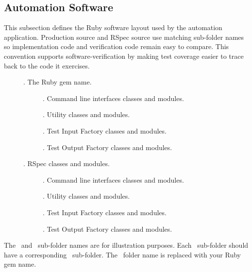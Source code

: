 \clearpage
\subsection{Automation Software}


\tlcVspace%

This subsection defines the Ruby software layout used by the automation
application. Production source and RSpec source use matching sub-folder names so
implementation code and verification code remain easy to compare. This
convention supports \gls{software-verification} by making test coverage easier
to trace back to the code it exercises.

\tlcVspace%

\begin{description}

  \item[\apName] \required. The Ruby gem name.
    \begin{description}
      \item[\apCli] \suggested. Command line interfaces classes and modules.
      \item[\apUtil] \suggested. Utility classes and modules.
      \item[\apTif] \suggested. Test Input Factory classes and modules.
      \item[\apTof] \suggested. Test Output Factory classes and modules.
    \end{description}

  \item[\apSpec] \required. RSpec classes and modules.
    \begin{description}
      \item[\apCli] \sameas. Command line interfaces classes and modules.
      \item[\apUtil] \sameas. Utility classes and modules.
      \item[\apTif] \sameas. Test Input Factory classes and modules.
      \item[\apTof] \sameas. Test Output Factory classes and modules.
    \end{description}

\end{description}

\tlcVspace%

The \apName\ and \apSpec\ sub-folder names are for illustration purposes.
Each \apName\ sub-folder should have a corresponding \apSpec\ sub-folder. The
\apName\ folder name is replaced with your Ruby gem name.
